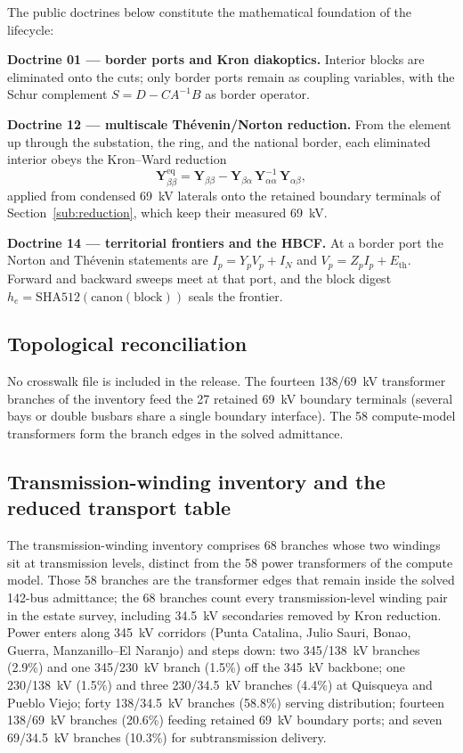 The public doctrines below constitute the mathematical foundation of the lifecycle:

\textbf{Doctrine 01 --- border ports and Kron diakoptics.} Interior blocks are eliminated onto the cuts; only border ports remain as coupling variables, with the Schur complement $S = D - C A^{-1} B$ as border operator.

\textbf{Doctrine 12 --- multiscale Th\'evenin/Norton reduction.} From the element up through the substation, the ring, and the national border, each eliminated interior obeys the Kron--Ward reduction
\begin{equation}
\mathbf{Y}_{\beta\beta}^{\mathrm{eq}} = \mathbf{Y}_{\beta\beta} - \mathbf{Y}_{\beta\alpha}\, \mathbf{Y}_{\alpha\alpha}^{-1}\, \mathbf{Y}_{\alpha\beta},
\label{eq:matrioshka}
\end{equation}
applied from condensed 69~kV laterals onto the retained boundary terminals of Section~\ref{sub:reduction}, which keep their measured 69~kV.

\textbf{Doctrine 14 --- territorial frontiers and the HBCF.} At a border port the Norton and Th\'evenin statements are $I_p=Y_p V_p+I_N$ and $V_p=Z_p I_p+E_{\mathrm{th}}$. Forward and backward sweeps meet at that port, and the block digest $h_e=\mathrm{SHA512}(\mathrm{canon}(\mathrm{block}))$ seals the frontier.

\subsection{Topological reconciliation}
\label{sub:crosswalk}

No crosswalk file is included in the release. The fourteen 138/69~kV transformer branches of the inventory feed the 27 retained 69~kV boundary terminals (several bays or double busbars share a single boundary interface). The 58 compute-model transformers form the branch edges in the solved admittance.

\subsection{Transmission-winding inventory and the reduced transport table}
\label{sub:inventory}

The transmission-winding inventory comprises 68 branches whose two windings sit at transmission levels, distinct from the 58 power transformers of the compute model. Those 58 branches are the transformer edges that remain inside the solved 142-bus admittance; the 68 branches count every transmission-level winding pair in the estate survey, including 34.5~kV secondaries removed by Kron reduction. Power enters along 345~kV corridors (Punta Catalina, Julio Sauri, Bonao, Guerra, Manzanillo--El Naranjo) and steps down: two 345/138~kV branches (2.9\%) and one 345/230~kV branch (1.5\%) off the 345~kV backbone; one 230/138~kV (1.5\%) and three 230/34.5~kV branches (4.4\%) at Quisqueya and Pueblo Viejo; forty 138/34.5~kV branches (58.8\%) serving distribution; fourteen 138/69~kV branches (20.6\%) feeding retained 69~kV boundary ports; and seven 69/34.5~kV branches (10.3\%) for subtransmission delivery.

